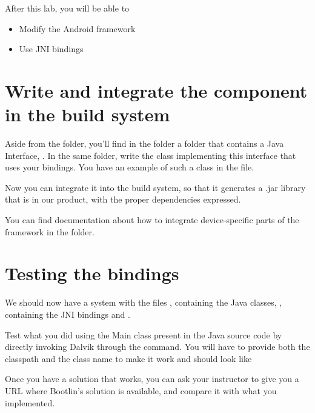 
After this lab, you will be able to
\begin{itemize}
  \item Modify the Android framework
  \item Use JNI bindings
\end{itemize}

\section{Write and integrate the component in the build system}

Aside from the  folder, you'll find in the 
folder a  folder that contains a Java Interface,
. In the same folder, write the
 class implementing this interface that uses your
bindings. You have an example of such a class in the
 file.

Now you can integrate it into the build system, so that it generates a .jar
library that is in our product, with the proper dependencies expressed.

You can find documentation about how to integrate device-specific parts of the
framework in the  folder.

\section{Testing the bindings}

We should now have a system with the files
, containing the Java
classes, , containing the JNI bindings and
.

Test what you did using the Main class present in the Java source code
by directly invoking Dalvik through the 
command. You will have to provide both the classpath and the class
name to make it work and should look like

Once you have a solution that works, you can ask your instructor to
give you a URL where Bootlin's solution is available, and compare
it with what you implemented.
